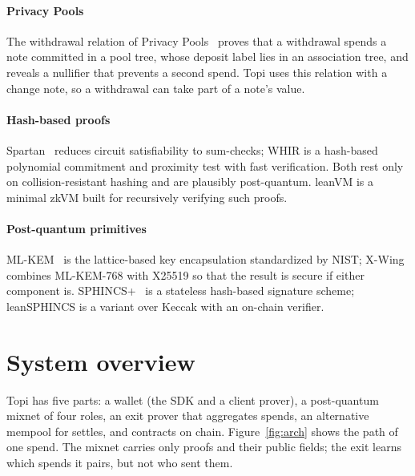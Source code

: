 \documentclass[11pt,a4paper]{article}
\begin{document}
\paragraph{Privacy Pools} The withdrawal relation of Privacy Pools~\cite{privacypools} proves that a
withdrawal spends a note committed in a pool tree, whose deposit label lies in an association tree, and
reveals a nullifier that prevents a second spend. Topi uses this relation with a change note, so a
withdrawal can take part of a note's value.

\paragraph{Hash-based proofs} Spartan~\cite{spartan} reduces circuit satisfiability to sum-checks; WHIR
\cite{whir} is a hash-based polynomial commitment and proximity test with fast verification. Both rest
only on collision-resistant hashing and are plausibly post-quantum. leanVM is a minimal zkVM built for
recursively verifying such proofs.

\paragraph{Post-quantum primitives} ML-KEM~\cite{fips203} is the lattice-based key encapsulation
standardized by NIST; X-Wing~\cite{xwing} combines ML-KEM-768 with X25519 so that the result is secure if
either component is. SPHINCS+~\cite{sphincs,fips205} is a stateless hash-based signature scheme;
leanSPHINCS is a variant over Keccak with an on-chain verifier.

\section{System overview}

Topi has five parts: a wallet (the SDK and a client prover), a post-quantum mixnet of four roles, an
exit prover that aggregates spends, an alternative mempool for settles, and contracts on chain. Figure~\ref{fig:arch} shows the path of one
spend. The mixnet carries only proofs and their public fields; the exit learns which spends it pairs,
but not who sent them.
\end{document}
